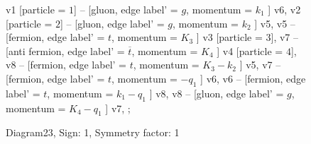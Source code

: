 \documentclass{revtex4}
\begin{document}
\begin{figure}[!htb]
\begin{center}
{    %
v1 [particle = \(1\)] -- [gluon, edge label' = \(g\), momentum = \(k_{1}\) ] v6, 
v2 [particle = \(2\)] -- [gluon, edge label' = \(g\), momentum = \(k_{2}\) ] v5, 
v5 -- [fermion, edge label' = \(t\), momentum = \(K_{3}\) ] v3 [particle = \(3\)], 
v7 -- [anti fermion, edge label' = \(\overline{t}\), momentum = \(K_{4}\) ] v4 [particle = \(4\)], 
v8 -- [fermion, edge label' = \(t\), momentum = \(K_{3} - k_{2}\) ] v5, 
v7 -- [fermion, edge label' = \(t\), momentum = \(-q_{1}\) ] v6, 
v6 -- [fermion, edge label' = \(t\), momentum = \(k_{1} - q_{1}\) ] v8, 
v8 -- [gluon, edge label' = \(g\), momentum = \(K_{4} - q_{1}\) ] v7, 
};
\end{center}
\caption{Diagram23, Sign: 1, Symmetry factor: 1}
\end{figure}
\newpage
\end{document}
